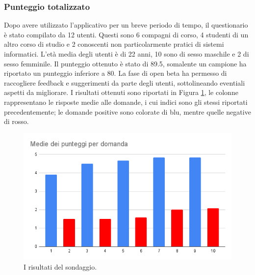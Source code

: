 \subsubsection{Punteggio totalizzato}
Dopo avere utilizzato l'applicativo per un breve periodo di tempo, il questionario è stato compilato da 12 utenti.
Questi sono 6 compagni di corso, 4 studenti di un altro corso di studio e 2 conoscenti non particolarmente pratici di sistemi informatici.
L'età media degli utenti è di 22 anni, 10 sono di sesso maschile e 2 di sesso femminile.
Il punteggio ottenuto è stato di 89.5, somalente un campione ha riportato un punteggio inferiore a 80.
La fase di open beta ha permesso di raccogliere feedback e suggerimenti da parte degli utenti, sottolineando eventiali aspetti da migliorare.
I risultati ottenuti sono riportati in Figura \ref{fig:result}, le colonne rappresentano le risposte medie alle domande, i cui indici sono gli stessi riportati precedentemente; le domande positive sono colorate di blu, mentre quelle negative di rosso.

\begin{figure}[h]
  \includegraphics[width=\linewidth]{img/media.png}
  \caption{I risultati del sondaggio.}
  \label{fig:result}
\end{figure}
